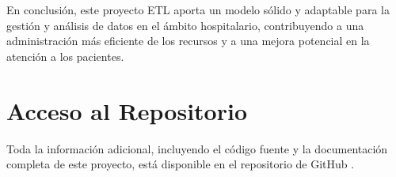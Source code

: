 \documentclass{article}
\begin{document}
	En conclusión, este proyecto ETL aporta un modelo sólido y adaptable para la gestión y análisis de datos en el ámbito hospitalario, contribuyendo a una administración más eficiente de los recursos y a una mejora potencial en la atención a los pacientes.
	
	\newpage
	\section{Acceso al Repositorio}
	
	Toda la información adicional, incluyendo el código fuente y la documentación completa de este proyecto, está disponible en el repositorio de GitHub \cite{silva2024github}.
	
	
\end{document}
